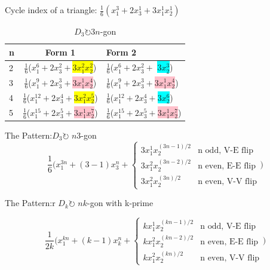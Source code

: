\documentclass{beamer}
\begin{document}
\begin{frame}
	Cycle index of a triangle:
	$\frac{1}{6}(x_1^3+2x_3^1+3x_1^1 x_2^1)$\\

	\begin{table}
		\centering
		\begin{tabular}{l|c|l}
			n &
            Form 1&
            Form 2\\ \hline
			2 &
            $\frac{1}{6}$($x_1^6+2x_3^2+$\colorbox{yellow}{$3x_1^2x_2^2$}) &
            $\frac{1}{6}$($x_1^6+2x_3^2+$ \colorbox{cyan}{$3x_2^3$})\\
			3 &
            $\frac{1}{6}$($x_1^9+2x_3^3+$\colorbox{pink}{$3x_1^1x_2^4$})  &
            $\frac{1}{6}$($x_1^9+2x_3^3+$\colorbox{pink}{$3x_1^1x_2^4$})\\
			4 &
            $\frac{1}{6}$($x_1^{12}+2x_3^4+$\colorbox{yellow}{$3x_1^2x_2^5$}) &
            $\frac{1}{6}$($x_1^{12}+2x_3^4+$\colorbox{cyan}{$3x_2^6$})\\
			5 &
            $\frac{1}{6}$($x_1^{15}+2x_3^5+$\colorbox{pink}{$3x_1^1x_2^7$}) &
			$\frac{1}{6}$($x_1^{15}+2x_3^5+$\colorbox{pink}{$3x_1^1x_2^7$})\\
		\end{tabular}
		\caption{$D_3 \circlearrowright 3n$-gon}
	\end{table}
\end{frame}
\begin{frame}{The Pattern:$D_3 \circlearrowright$ $n3$-gon}
\[\dfrac{1}{6}\Bigg(x_1^{3n}+(3-1)x_3^n +
\begin{cases}
3x_1^1x_2^{(3n-1)/2} & \text{n odd, V-E flip} \\
3x_1^2x_2^{(3n-2)/2} & \text{n even, E-E flip}\\
3x_1^2x_2^{(3n)/2} & \text{n even, V-V flip}
\end{cases}\Bigg)\]
 \end{frame}
 \begin{frame}{The Pattern:r $D_k \circlearrowright$ $nk$-gon with k-prime}
  \begin{tcolorbox}[colback=yellow!10!white,colframe=red!75!black,title=Formula]
\[\dfrac{1}{2k}\Bigg(x_1^{kn}+(k-1)x_k^n +
\begin{cases}
kx_1^1x_2^{(kn-1)/2} & \text{n odd, V-E flip} \\
kx_1^2x_2^{(kn-2)/2} & \text{n even, E-E flip}\\
kx_1^2x_2^{(kn)/2} & \text{n even, V-V flip}
\end{cases}\bigg)\]
\end{tcolorbox}
 \end{frame}
\end{document}
